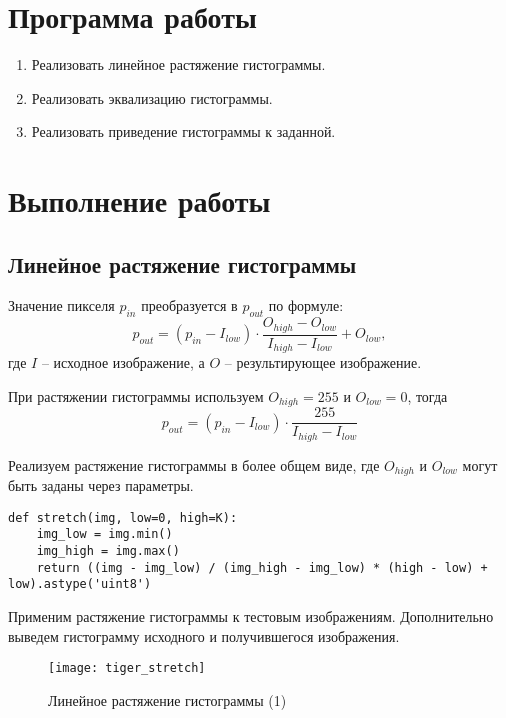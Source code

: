 





\tableofcontents
\newpage

\section{Программа работы}

\begin{enumerate}
	\item Реализовать линейное растяжение гистограммы.
	\item Реализовать эквализацию гистограммы.
	\item Реализовать приведение гистограммы к заданной.
\end{enumerate}

\section{Выполнение работы}

\subsection{Линейное растяжение гистограммы}

Значение пикселя $p_{in}$ преобразуется в $p_{out}$ по формуле:
$$
p_{out} = (p_{in} - I_{low}) \cdot \frac{O_{high} - O_{low}}{I_{high} - I_{low}} + O_{low},
$$
где $I$ -- исходное изображение, а $O$ -- результирующее изображение.

При растяжении гистограммы используем $O_{high} = 255$ и $O_{low} = 0$, тогда
$$
p_{out} = (p_{in} - I_{low}) \cdot \frac{255}{I_{high} - I_{low}}
$$

Реализуем растяжение гистограммы в более общем виде, где $O_{high}$ и $O_{low}$ могут быть заданы через параметры.

\begin{lstlisting}
def stretch(img, low=0, high=K):
	img_low = img.min()
	img_high = img.max()
	return ((img - img_low) / (img_high - img_low) * (high - low) + low).astype('uint8')
\end{lstlisting}

Применим растяжение гистограммы к тестовым изображениям. Дополнительно выведем гистограмму исходного и получившегося изображения.

\begin{figure}[H]
	\centering
	\texttt{[image: tiger\_stretch]}
	\caption{Линейное растяжение гистограммы (1)}
\end{figure}

